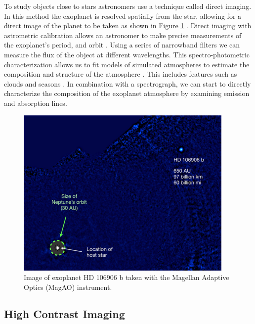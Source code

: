  To study objects close to stars astronomers use a technique called direct imaging. In this method the exoplanet is resolved spatially from the star, allowing for a direct image of the planet to be taken as shown in Figure \ref{fig:exoplanets} \citep{bailey2013hd}. Direct imaging with astrometric calibration allows an astronomer to make precise measurements of the exoplanet’s period, and orbit \citep{seager2010exoplanets}. Using a series of narrowband filters we can measure the flux of the object at different wavelengths. This spectro-photometric characterization allows us to fit models of simulated atmospheres to estimate the composition and structure of the atmosphere \citep{morzinski2015magellan}. This includes features such as clouds and seasons \citep{skemer2012first}. In combination with a spectrograph, we can start to directly characterize the composition of the exoplanet atmosphere by examining emission and absorption lines. 
 

\begin{figure}
    \centering
    \includegraphics{Chapter Materials/Introduction Materials/Introduction Figures/HCexoplanet.png}
    \caption{Image of exoplanet HD 106906 b taken with the Magellan Adaptive Optics (MagAO) instrument. \citep{bailey2013hd}}
    \label{fig:exoplanets}
\end{figure}



\subsection{High Contrast Imaging}

